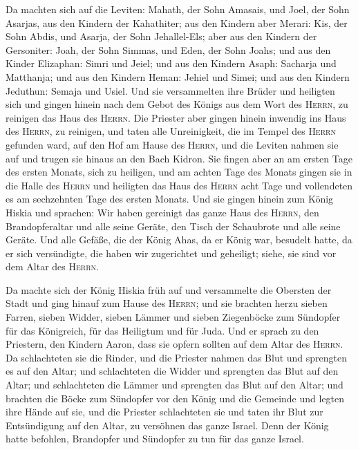  Da machten sich auf die Leviten: Mahath, der Sohn
Amasais, und Joel, der Sohn Asarjas, aus den Kindern der Kahathiter; aus
den Kindern aber Merari: Kis, der Sohn Abdis, und Asarja, der Sohn
Jehallel-Els; aber aus den Kindern der Gersoniter: Joah, der Sohn
Simmas, und Eden, der Sohn Joahs;  und aus den Kinder
Elizaphan: Simri und Jeiel; und aus den Kindern Asaph: Sacharja und
Matthanja;  und aus den Kindern Heman: Jehiel und Simei;
und aus den Kindern Jeduthun: Semaja und Usiel.  Und sie
versammelten ihre Brüder und heiligten sich und gingen hinein nach dem
Gebot des Königs aus dem Wort des \textsc{Herrn}, zu reinigen das Haus
des \textsc{Herrn}.  Die Priester aber gingen hinein
inwendig ins Haus des \textsc{Herrn}, zu reinigen, und taten alle
Unreinigkeit, die im Tempel des \textsc{Herrn} gefunden ward, auf den
Hof am Hause des \textsc{Herrn}, und die Leviten nahmen sie auf und
trugen sie hinaus an den Bach Kidron.  Sie fingen aber an
am ersten Tage des ersten Monats, sich zu heiligen, und am achten Tage
des Monats gingen sie in die Halle des \textsc{Herrn} und heiligten das
Haus des \textsc{Herrn} acht Tage und vollendeten es am sechzehnten Tage
des ersten Monats.  Und sie gingen hinein zum König
Hiskia und sprachen: Wir haben gereinigt das ganze Haus des
\textsc{Herrn}, den Brandopferaltar und alle seine Geräte, den Tisch der
Schaubrote und alle seine Geräte.  Und alle Gefäße, die
der König Ahas, da er König war, besudelt hatte, da er sich versündigte,
die haben wir zugerichtet und geheiligt; siehe, sie sind vor dem Altar
des \textsc{Herrn}.

 Da machte sich der König Hiskia früh auf und versammelte
die Obersten der Stadt und ging hinauf zum Hause des \textsc{Herrn};
 und sie brachten herzu sieben Farren, sieben Widder,
sieben Lämmer und sieben Ziegenböcke zum Sündopfer für das Königreich,
für das Heiligtum und für Juda. Und er sprach zu den Priestern, den
Kindern Aaron, dass sie opfern sollten auf dem Altar des \textsc{Herrn}.
 Da schlachteten sie die Rinder, und die Priester nahmen
das Blut und sprengten es auf den Altar; und schlachteten die Widder und
sprengten das Blut auf den Altar; und schlachteten die Lämmer und
sprengten das Blut auf den Altar;  und brachten die Böcke
zum Sündopfer vor den König und die Gemeinde und legten ihre Hände auf
sie,  und die Priester schlachteten sie und taten ihr
Blut zur Entsündigung auf den Altar, zu versöhnen das ganze Israel. Denn
der König hatte befohlen, Brandopfer und Sündopfer zu tun für das ganze
Israel.

